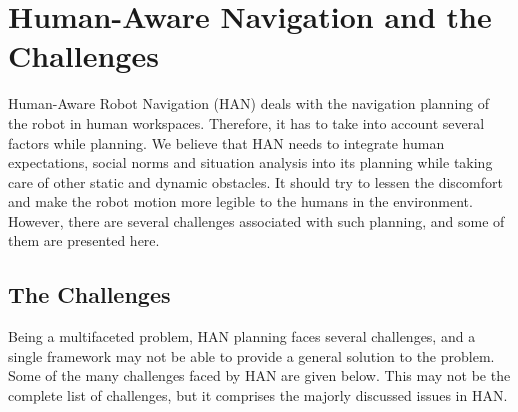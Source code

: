 \section{Human-Aware Navigation and the Challenges}

Human-Aware Robot Navigation (HAN) deals with the navigation planning of the robot in human workspaces. Therefore, it has to take into account several factors while planning. We believe that HAN needs to integrate human expectations, social norms and situation analysis into its planning while taking care of other static and dynamic obstacles. It should try to lessen the discomfort and make the robot motion more legible to the humans in the environment. However, there are several challenges associated with such planning, and some of them are presented here.

\subsection{The Challenges}
Being a multifaceted problem, HAN planning faces several challenges, and a single framework may not be able to provide a general solution to the problem. Some of the many challenges faced by HAN are given below. This may not be the complete list of challenges, but it comprises the majorly discussed issues in HAN. 
